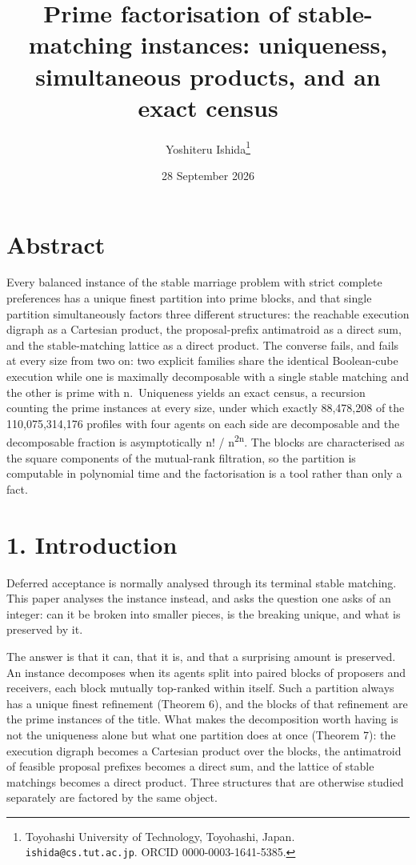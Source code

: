 \documentclass[
  11pt,
]{article}
\title{Prime factorisation of stable-matching instances: uniqueness,
simultaneous products, and an exact census}
\author{Yoshiteru Ishida\thanks{Toyohashi University of Technology, Toyohashi, Japan. \texttt{ishida@cs.tut.ac.jp}. ORCID 0000-0003-1641-5385.}}
\date{28 September 2026}
\begin{document}
\maketitle

\hypertarget{abstract}{%
\section{Abstract}\label{abstract}}

Every balanced instance of the stable marriage problem with strict
complete preferences has a unique finest partition into prime blocks,
and that single partition simultaneously factors three different
structures: the reachable execution digraph as a Cartesian product, the
proposal-prefix antimatroid as a direct sum, and the stable-matching
lattice as a direct product. The converse fails, and fails at every size
from two on: two explicit families share the identical Boolean-cube
execution while one is maximally decomposable with a single stable
matching and the other is prime with n.~Uniqueness yields an exact
census, a recursion counting the prime instances at every size, under
which exactly 88,478,208 of the 110,075,314,176 profiles with four
agents on each side are decomposable and the decomposable fraction is
asymptotically n! / n\textsuperscript{2n}. The blocks are characterised
as the square components of the mutual-rank filtration, so the partition
is computable in polynomial time and the factorisation is a tool rather
than only a fact.

\hypertarget{introduction}{%
\section{1. Introduction}\label{introduction}}

Deferred acceptance is normally analysed through its terminal stable
matching. This paper analyses the instance instead, and asks the
question one asks of an integer: can it be broken into smaller pieces,
is the breaking unique, and what is preserved by it.

The answer is that it can, that it is, and that a surprising amount is
preserved. An instance decomposes when its agents split into paired
blocks of proposers and receivers, each block mutually top-ranked within
itself. Such a partition always has a unique finest refinement (Theorem
6), and the blocks of that refinement are the prime instances of the
title. What makes the decomposition worth having is not the uniqueness
alone but what one partition does at once (Theorem 7): the execution
digraph becomes a Cartesian product over the blocks, the antimatroid of
feasible proposal prefixes becomes a direct sum, and the lattice of
stable matchings becomes a direct product. Three structures that are
otherwise studied separately are factored by the same object.
\end{document}
